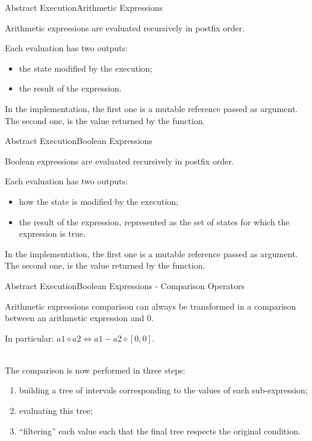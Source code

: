 \documentclass{beamer}
\begin{document}
\begin{frame}{Abstract Execution}{Arithmetic Expressions}

    Arithmetic expressions are evaluated recursively in postfix order.

    Each evaluation has two outputs:
    \begin{itemize}
        \item the state modified by the execution;
        \item the result of the expression.
    \end{itemize}

    In the implementation, the first one is a mutable reference passed as argument.
    The second one, is the value returned by the function.

\end{frame}

\begin{frame}{Abstract Execution}{Boolean Expressions}

    Boolean expressions are evaluated recursively in postfix order.

    Each evaluation has two outputs:
    \begin{itemize}
        \item how the state is modified by the execution;
        \item the result of the expression, represented as the set of states for which the expression is true.
    \end{itemize}

    In the implementation, the first one is a mutable reference passed as argument.
    The second one, is the value returned by the function.

\end{frame}

\begin{frame}{Abstract Execution}{Boolean Expressions - Comparison Operators}

    Arithmetic expressions comparison can always be transformed in a comparison between an arithmetic expression and $0$.

    In particular: $\textit{a1} \diamond \textit{a2} \iff \textit{a1} - \textit{a2} \diamond [0, 0]$.

    ~\\
    The comparison is now performed in three steps:
    \begin{enumerate}
        \item building a tree of intervals corresponding to the values of each sub-expression;
        \item evaluating this tree;
        \item ``filtering'' each value such that the final tree respects the original condition.
    \end{enumerate}

\end{frame}
\end{document}
